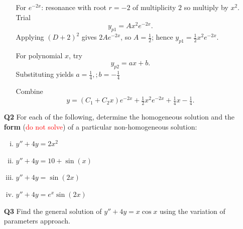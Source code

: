 \documentclass[a4paper,11pt,reqno]{amsart}
\numberwithin{equation}{section}
\begin{document}
\begin{enumerate}
\begin{enumerate}[(a)]
\begin{center}
{{          For \(e^{-2x}\): resonance with root \(r=-2\) of multiplicity \(2\) so multiply by \(x^2\). Trial
          \[
          y_{p1}=A x^2 e^{-2x}.
         \]
          Applying \((D+2)^2\) gives \(2A e^{-2x}\), so \(A=\tfrac12\); hence \(y_{p1}=\tfrac12 x^2 e^{-2x}\).

          For polynomial \(x\), try
          \[
          y_{p2}=ax+b.
         \]
          Substituting yields \(a=\tfrac14,; b=-\tfrac14\)

          Combine
          \[
          \boxed{y=(C_1 + C_2 x)e^{-2x} + \tfrac12 x^2 e^{-2x} + \tfrac14 x -\tfrac14.}
         \]
        }}
        \end{center}
      \end{enumerate}

  \vspace{0.5cm}

  \item[\textbf{Q2}] For each of the following, determine the homogeneous solution and the \textbf{form} (\textcolor{red}{do not solve}) of a 
    particular non-homogeneous solution:
      \begin{enumerate}[(i)]
        \item \(y'' + 4y = 2x^{2}\)
        \item \(y'' + 4y = 10 + \sin(x)\)
        \item \(y'' + 4y = \sin(2 x)\)
        \item \(y'' + 4y = e^{x}\sin(2 x)\)
      \end{enumerate}

    \begin{center}\setlength{\fboxsep}{10pt}
    \end{center}

  \item[\textbf{Q3}] Find the general solution of \(y'' + 4y = x\cos{x}\) using the variation of parameters approach.
  \begin{center}\setlength{\fboxsep}{10pt}
\end{center}
\end{enumerate}
\end{document}
